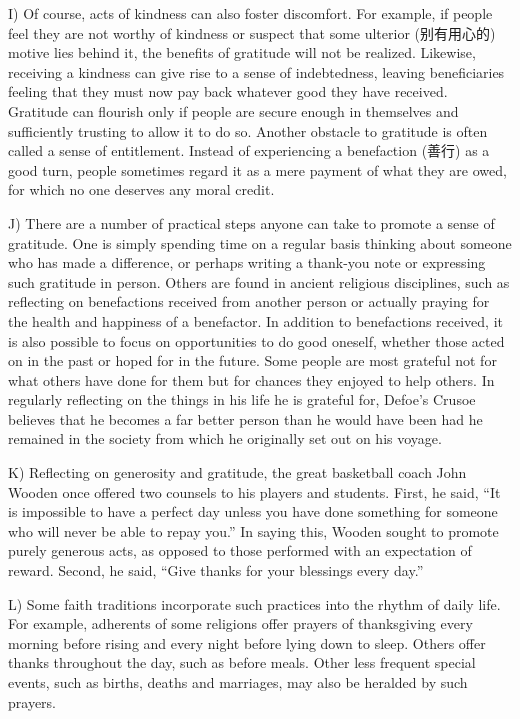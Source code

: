 \documentclass[UTF8,11pt]{ctexart}
\begin{document}
I) Of course, acts of kindness can also foster discomfort. For example, if people feel they are not worthy of kindness or suspect that some ulterior (别有用心的) motive lies behind it, the benefits of gratitude will not be realized. Likewise, receiving a kindness can give rise to a sense of indebtedness, leaving beneficiaries feeling that they must now pay back whatever good they have received. Gratitude can flourish only if people are secure enough in themselves and sufficiently trusting to allow it to do so. Another obstacle to gratitude is often called a sense of entitlement. Instead of experiencing a benefaction (善行) as a good turn, people sometimes regard it as a mere payment of what they are owed, for which no one deserves any moral credit.


J) There are a number of practical steps anyone can take to promote a sense of gratitude. One is simply spending time on a regular basis thinking about someone who has made a difference, or perhaps writing a thank-you note or expressing such gratitude in person. Others are found in ancient religious disciplines, such as reflecting on benefactions received from another person or actually praying for the health and happiness of a benefactor. In addition to benefactions received, it is also possible to focus on opportunities to do good oneself, whether those acted on in the past or hoped for in the future. Some people are most grateful not for what others have done for them but for chances they enjoyed to help others. In regularly reflecting on the things in his life he is grateful for, Defoe’s Crusoe believes that he becomes a far better person than he would have been had he remained in the society from which he originally set out on his voyage.


K) Reflecting on generosity and gratitude, the great basketball coach John Wooden once offered two counsels to his players and students. First, he said, “It is impossible to have a perfect day unless you have done something for someone who will never be able to repay you.” In saying this, Wooden sought to promote purely generous acts, as opposed to those performed with an expectation of reward. Second, he said, “Give thanks for your blessings every day.”


L) Some faith traditions incorporate such practices into the rhythm of daily life. For example, adherents of some religions offer prayers of thanksgiving every morning before rising and every night before lying down to sleep. Others offer thanks throughout the day, such as before meals. Other less frequent special events, such as births, deaths and marriages, may also be heralded by such prayers.
\end{document}
